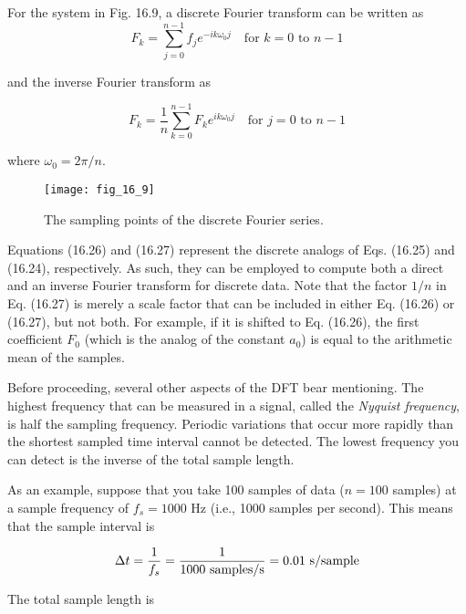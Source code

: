 \documentclass[../main.tex]{subfiles}
\begin{document}
For the system in Fig. 16.9, a discrete Fourier transform can be written as
\begin{equation}
	\tag{16.26}
	F_k = \sum ^ {n-1} _ {j=0} f_j e ^ {-ik \omega_0 j} \quad \text{for } k=0 \text{ to } n - 1
\end{equation}

\noindent and the inverse Fourier transform as

\begin{equation}
	\tag{16.27}
	F_k = \frac{1}{n} \sum ^ {n-1} _ {k=0} F_k e ^ {ik \omega_0 j} \quad \text{for } j=0 \text{ to } n - 1
\end{equation}

\noindent where $\omega_0 = 2 \pi / n$.

\begin{figure}[H] 
	\centering
	\texttt{[image: fig\_16\_9]}
	\caption{\textsf{The sampling points of the discrete Fourier series.}}
	\label{fig:fig_16_9}
\end{figure}

Equations (16.26) and (16.27) represent the discrete analogs of Eqs. (16.25) and
(16.24), respectively. As such, they can be employed to compute both a direct and an inverse Fourier transform for discrete data. Note that the factor $1/n$ in Eq. (16.27) is merely
a scale factor that can be included in either Eq. (16.26) or (16.27), but not both. For example, if it is shifted to Eq. (16.26), the first coefficient $F_0$ (which is the analog of the constant
$a_0$) is equal to the arithmetic mean of the samples.

Before proceeding, several other aspects of the DFT bear mentioning. The highest frequency that can be measured in a signal, called the \textit{Nyquist frequency}, is half the sampling
frequency. Periodic variations that occur more rapidly than the shortest sampled time interval cannot be detected. The lowest frequency you can detect is the inverse of the total
sample length.

As an example, suppose that you take 100 samples of data ($n = 100$ samples) at a
sample frequency of $f_s = 1000$ Hz (i.e., 1000 samples per second). This means that the
sample interval is

\begin{equation}
	\notag
	\Delta t = \frac{1}{f_s}=\frac{1}{1000 \text{ samples/s}} = 0.01 \text{ s/sample}
\end{equation}

\noindent The total sample length is 
\end{document}
